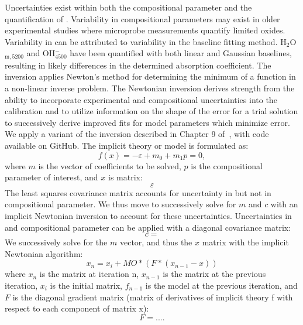 \documentclass[draft]{agujournal2019}
\begin{document}
Uncertainties exist within both the compositional parameter and the quantification of \textepsilon. Variability in compositional parameters may exist in older experimental studies where microprobe measurements quantify limited oxides. Variability in \textepsilon can be attributed to variability in the baseline fitting method. H$_{2}$O$_{\mathrm{m}, 5200}$ and \textepsilon${\mathrm{OH^{-}_{4500}}}$ have been quantified with both linear and Gaussian baselines, resulting in likely differences in the determined absorption coefficient. The inversion applies Newton’s method for determining the minimum of a function in a non-linear inverse problem. The Newtonian inversion derives strength from the ability to incorporate experimental and compositional uncertainties into the calibration and to utilize information on the shape of the error for a trial solution to successively derive improved fits for model parameters which minimize error. We apply a variant of the inversion described in Chapter 9 of~, with code available on GitHub. The implicit theory or model is formulated as: 
\begin{equation}
    f(x) = -\varepsilon + m_0 + m_1 p = 0, 
\end{equation}
where $m$ is the vector of coefficients to be solved, $p$ is the compositional parameter of interest, and $x$ is matrix: 
\begin{equation}
    \varepsilon
\end{equation}
The least squares covariance matrix accounts for uncertainty in \textepsilon but not in compositional parameter. We thus move to successively solve for $m$ and $c$ with an implicit Newtonian inversion to account for these uncertainties. Uncertainties in \textepsilon and compositional parameter can be applied with a diagonal covariance matrix: 
\begin{equation} 
    c = 
\end{equation}
We successively solve for the $m$ vector, and thus the $x$ matrix with the implicit Newtonian algorithm: 
\begin{equation}
    x_n = x_i + MO * (F*(x_{n-1} - x))
\end{equation}
where $x_n$ is the matrix at iteration n, $x_{n-1}$ is the matrix at the previous iteration, $x_i$ is the initial matrix, $f_{n-1}$ is the model at the previous iteration, and $F$ is the diagonal gradient matrix (matrix of derivatives of implicit theory f with respect to each component of matrix x): 
\begin{equation}
    F = ....
\end{equation}
\end{document}

